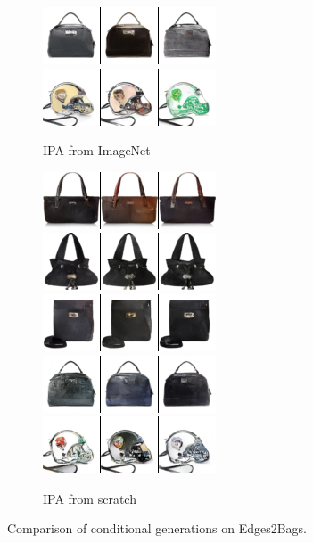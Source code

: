 \begin{figure}[t]
\begin{subfigure}[t]{0.27\textwidth}
      \includegraphics[height=\edgesstuffimgheight]{figs/cigcvae/image-samples/bags/image_aipo_3_imagenet_samples.png}
      \includegraphics[height=\edgesstuffimgheight]{figs/cigcvae/image-samples/bags/image_aipo_4_imagenet_samples.png}
      \caption{IPA from ImageNet}
    \end{subfigure}
    \begin{subfigure}[t]{0.27\textwidth}
      \centering
      \includegraphics[height=\edgesstuffimgheight]{figs/cigcvae/image-samples/bags/image_aipo_0_scratch_samples.png}
      \includegraphics[height=\edgesstuffimgheight]{figs/cigcvae/image-samples/bags/image_aipo_1_scratch_samples.png}
      \includegraphics[height=\edgesstuffimgheight]{figs/cigcvae/image-samples/bags/image_aipo_2_scratch_samples.png}
      \includegraphics[height=\edgesstuffimgheight]{figs/cigcvae/image-samples/bags/image_aipo_3_scratch_samples.png}
      \includegraphics[height=\edgesstuffimgheight]{figs/cigcvae/image-samples/bags/image_aipo_4_scratch_samples.png}
      \caption{IPA from scratch}
    \end{subfigure}
    \caption{Comparison of conditional generations on Edges2Bags.}
    \vspace{-.5cm}
    \label{fig:cigcvae-bags-samples}
  \end{figure}

